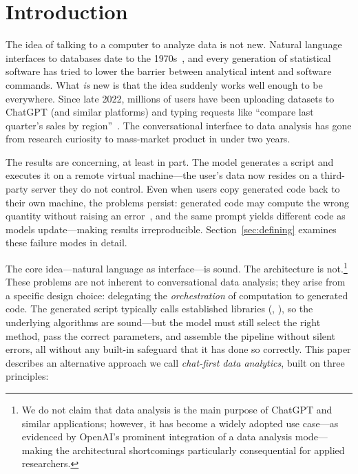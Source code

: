 
\section{Introduction} \label{sec:intro}

The idea of talking to a computer to analyze data is not new. Natural
language interfaces to databases date to the
1970s~\citep{Woods:1973, Codd:1974}, and every generation of statistical software
has tried to lower the barrier between analytical intent and software
commands. What \emph{is} new is that the idea suddenly works well
enough to be everywhere. Since late 2022, millions of users have been
uploading datasets to ChatGPT (and similar platforms) and typing requests like ``compare last
quarter's sales by region''~\citep{Hu:2023}. The conversational
interface to data analysis has gone from research curiosity to
mass-market product in under two years.

The results are concerning, at least in part. The model generates a 
script and executes it on a remote virtual machine---the user's data
now resides on a third-party server they do not control. Even when
users copy generated code back to their own machine, the problems
persist: generated code may compute the wrong quantity without raising
an error~\citep{Ludwig+Mullainathan+Rambachan:2025}, and the same
prompt yields different code as models update---making results
irreproducible. Section~\ref{sec:defining} examines these failure
modes in detail.

The core idea---natural language as interface---is sound. The
architecture is not.\footnote{We do not claim that data analysis is the main purpose of ChatGPT and similar applications; however, it has become a widely adopted use case---as evidenced by OpenAI's prominent integration of a data analysis mode---making the architectural shortcomings particularly consequential for applied researchers.} These problems are not inherent to
conversational data analysis; they arise from a specific design
choice: delegating the \emph{orchestration} of computation to generated
code. The generated script typically calls established libraries
(, ), so the underlying algorithms are
sound---but the model must still select the right method, pass the
correct parameters, and assemble the pipeline without silent errors,
all without any built-in safeguard that it has done so correctly.
This paper describes
an alternative approach we call \emph{chat-first data analytics}, built
on three principles:

